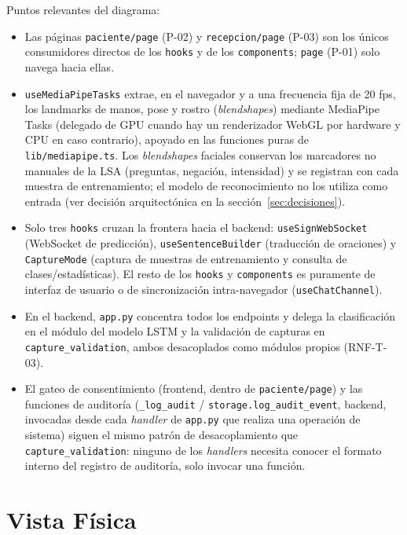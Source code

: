 Puntos relevantes del diagrama:
\begin{itemize}
    \item Las páginas \texttt{paciente/page} (P-02) y \texttt{recepcion/page}
    (P-03) son los únicos consumidores directos de los \texttt{hooks} y de
    los \texttt{components}; \texttt{page} (P-01) solo navega hacia ellas.
    \item \texttt{useMediaPipeTasks} extrae, en el navegador y a una
    frecuencia fija de 20 fps, los landmarks de manos, pose y rostro
    (\textit{blendshapes}) mediante MediaPipe Tasks (delegado de GPU cuando
    hay un renderizador WebGL por hardware y CPU en caso contrario), apoyado
    en las funciones puras de \texttt{lib/mediapipe.ts}. Los
    \textit{blendshapes} faciales conservan los marcadores no manuales de la
    LSA (preguntas, negación, intensidad) y se registran con cada muestra de
    entrenamiento; el modelo de reconocimiento no los utiliza como entrada
    (ver decisión arquitectónica en la sección~\ref{sec:decisiones}).
    \item Solo tres \texttt{hooks} cruzan la frontera hacia el backend:
    \texttt{useSignWebSocket} (WebSocket de predicción),
    \texttt{useSentenceBuilder} (traducción de oraciones) y
    \texttt{CaptureMode} (captura de muestras de entrenamiento y consulta de
    clases/estadísticas). El resto de los \texttt{hooks} y \texttt{components}
    es puramente de interfaz de usuario o de sincronización intra-navegador
    (\texttt{useChatChannel}).
    \item En el backend, \texttt{app.py} concentra todos los endpoints y
    delega la clasificación en el módulo del modelo LSTM y la validación de
    capturas en \texttt{capture\_validation}, ambos desacoplados como
    módulos propios (RNF-T-03).
    \item El gateo de consentimiento (frontend, dentro de
    \texttt{paciente/page}) y las funciones de auditoría
    (\texttt{\_log\_audit} / \texttt{storage.log\_audit\_event}, backend, invocadas
    desde cada \textit{handler} de \texttt{app.py} que realiza una
    operación de sistema) siguen el mismo patrón de desacoplamiento que
    \texttt{capture\_validation}: ninguno de los \textit{handlers}
    necesita conocer el formato interno del registro de auditoría, solo
    invocar una función.
\end{itemize}

\section{Vista Física}
\label{sec:vista-fisica}


